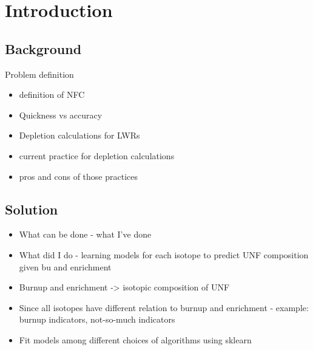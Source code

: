 \section{Introduction}
\subsection{Background}
Problem definition
\begin{itemize}
    \item definition of NFC
    \item Quickness vs accuracy
    \item Depletion calculations for LWRs
    \item current practice for depletion calculations
    \item pros and cons of those practices
\end{itemize}


\subsection{Solution}
\begin{itemize}
    \item What can be done - what I've done
    \item What did I do - learning models for each isotope to predict UNF composition given bu and enrichment
    \item Burnup and enrichment -> isotopic composition of UNF
    \item Since all isotopes have different relation to burnup and enrichment
            - example: burnup indicators, not-so-much indicators
    \item Fit models among different choices of algorithms using sklearn
\end{itemize}